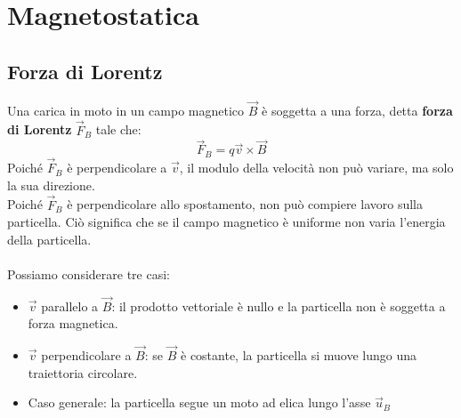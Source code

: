 \chapter{Magnetostatica}

\section{Forza di Lorentz}
Una carica in moto in un campo magnetico $\vec{B}$ è soggetta a una forza, detta \textbf{forza di Lorentz} $\vec{F}_B$ tale che:
\begin{displaymath}
	\vec{F}_B = q \vec{v} \times \vec{B}
\end{displaymath}
Poiché $\vec{F}_B$ è perpendicolare a $\vec{v}$, il modulo della velocità non può variare, ma solo la sua direzione.\\
Poiché $\vec{F}_B$ è perpendicolare allo spostamento, non può compiere lavoro sulla particella. Ciò significa che se il campo magnetico è uniforme non varia l'energia della particella.\\\\
Possiamo considerare tre casi:
\begin{itemize}
	\item{$\vec{v}$ parallelo a $\vec{B}$: il prodotto vettoriale è nullo e la particella non è soggetta a forza magnetica.}
    \item{$\vec{v}$ perpendicolare a $\vec{B}$: se $\vec{B}$ è costante, la particella si muove lungo una traiettoria circolare.}
    \item{Caso generale: la particella segue un moto ad elica lungo l'asse $\vec{u}_B$}
\end{itemize}

